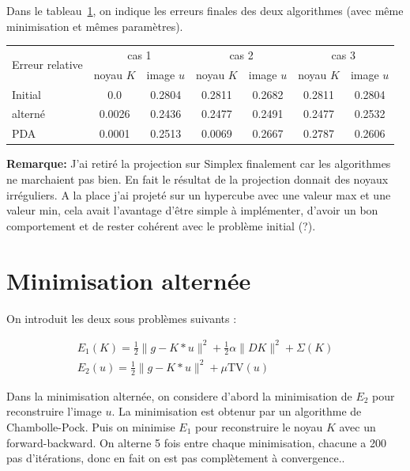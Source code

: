 \documentclass[a4paper]{article}
\newenvironment{remarque}{\textbf{Remarque:}}{}
\begin{document}
Dans le tableau~\ref{tab:compare}, on indique les erreurs finales des deux algorithmes 
(avec même minimisation et mêmes paramètres).
\begin{table}[h]
    \centering
    \begin{tabular}{lcccccc}
    \multirow{2}{*}{Erreur relative}
    &\multicolumn{2}{c}{cas 1}
    &\multicolumn{2}{c}{cas 2}
    &\multicolumn{2}{c}{cas 3}\\
    \cline{2-3}
    \cline{4-5}
    \cline{6-7}
    &noyau $K$& image $u$
    &noyau $K$& image $u$
   &noyau $K$& image $u$
    \\
    \hline
   Initial  &   0.0 & 0.2804
              &  0.2811  & 0.2682
              & 0.2811  & 0.2804
    \\
    alterné  & 0.0026 & 0.2436
                 &0.2477   & 0.2491
                 & 0.2477 &0.2532
    \\
    PDA  &0.0001    & 0.2513
               & 0.0069  & 0.2667
               & 0.2787   &0.2606 
    \end{tabular}
    \label{tab:compare}
\end{table}

\begin{remarque}
J'ai retiré la projection sur Simplex finalement car les algorithmes ne marchaient pas bien. 
En fait le résultat de la projection donnait des noyaux irréguliers.
A la place j'ai projeté sur un hypercube avec une valeur max et une valeur min, cela avait l'avantage d'être simple à implémenter, d'avoir un bon comportement et de rester cohérent avec le problème initial (?).
\end{remarque}

\section{Minimisation alternée}

On introduit les deux sous problèmes suivants :

\begin{align}
E_1(K) = \frac{1}{2} \| g - K * u\|^2 + \frac{1}{2} \alpha \| D K \|^2 + \Sigma(K) \\
E_2(u) = \frac{1}{2} \| g - K * u\|^2 +  \mu \text{TV} (u)
\end{align}

Dans la minimisation alternée, on considere d'abord la minimisation de $E_2$ 
pour reconstruire l'image $u$. 
La minimisation est obtenur par un algorithme de Chambolle-Pock.
 Puis on minimise $E_1$ pour reconstruire le noyau $K$ avec un forward-backward.
On alterne 5 fois entre chaque minimisation, chacune a 200 pas d'itérations, donc en fait on est pas complètement à convergence..
\end{document}

